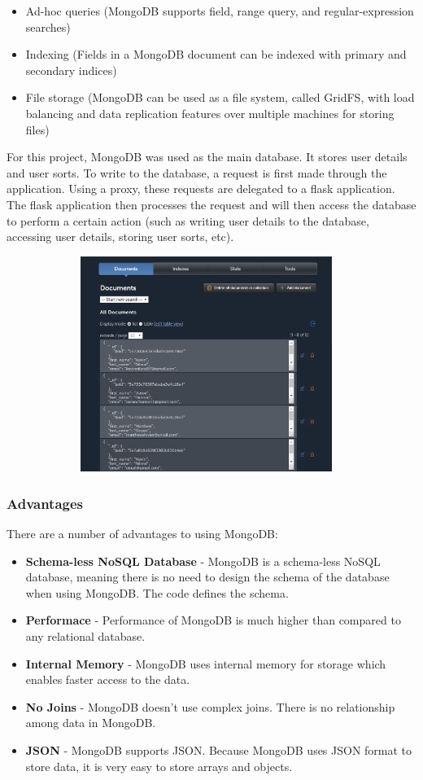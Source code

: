 \begin{itemize}
    \item Ad-hoc queries (MongoDB supports field, range query, and
    regular-expression searches)
    \item Indexing (Fields in a MongoDB document can be indexed with primary and
    secondary indices)
    \item File storage (MongoDB can be used as a file system, called GridFS,
    with load balancing and data replication features over multiple machines for
    storing files)  
\end{itemize}

For this project, MongoDB was used as the main database. It stores user details
and user sorts. To write to the database, a request is first made through the 
application. Using a proxy, these requests are delegated to a flask application.
The flask application then processes the request and will then access the 
database to perform a certain action (such as writing user details to the 
database, accessing user details, storing user sorts, etc). 

\begin{center}
    \includegraphics[width=13cm,height=7cm,keepaspectratio]{images/mlab}
\end{center}

\subsubsection{Advantages}
There are a number of advantages to using MongoDB:

\begin{itemize}
    \item \textbf{Schema-less NoSQL Database} - MongoDB is a schema-less NoSQL
    database, meaning there is no need to design the schema of the database when
    using MongoDB. The code defines the schema.
    \item \textbf{Performace} - Performance of MongoDB is much higher than
    compared to any relational database.
    \item \textbf{Internal Memory} - MongoDB uses internal memory for storage
    which enables faster access to the data.
    \item \textbf{No Joins} - MongoDB doesn't use complex joins. There is no
    relationship among data in MongoDB.
    \item \textbf{JSON} - MongoDB supports JSON. Because MongoDB uses JSON
    format to store data, it is very easy to store arrays and objects.
\end{itemize}


